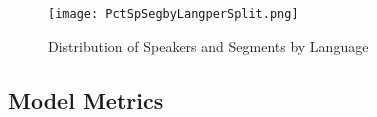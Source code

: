 \documentclass[11pt, letterpaper]{article}
\begin{document}

\begin{figure}[h]
\begin{center}
\texttt{[image: PctSpSegbyLangperSplit.png]}
\caption{Distribution of Speakers and Segments by Language}
\label{fig:LangDist}
\end{center}
\end{figure}

\subsection{Model Metrics}
\end{document}
